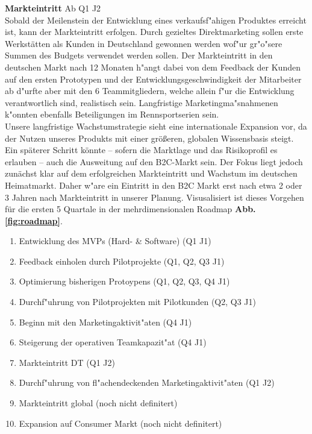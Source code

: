 \textbf{Markteintritt} Ab Q1 J2 \\
Sobald der Meilenstein der Entwicklung eines verkaufsf"ahigen Produktes erreicht ist, kann der Markteintritt erfolgen. Durch gezieltes Direktmarketing sollen erste Werkst\"atten als Kunden in Deutschland gewonnen werden wof"ur gr"o"sere Summen des Budgets verwendet werden sollen. Der Markteintritt in den deutschen Markt nach 12 Monaten h"angt dabei von dem Feedback der Kunden auf den ersten Prototypen und der Entwicklungsgeschwindigkeit der Mitarbeiter ab d"urfte aber mit den 6 Teammitgliedern, welche allein f"ur die Entwicklung verantwortlich sind, realistisch sein. Langfristige Marketingma"snahmenen k"onnten ebenfalls Beteiligungen im Rennsportserien sein. \\

Unsere langfristige Wachstumstrategie sieht eine internationale Expansion vor, da der Nutzen unseres Produkts mit einer größeren, globalen Wissensbasis steigt. Ein späterer Schritt könnte – sofern die Marktlage und das Risikoprofil es erlauben – auch die Ausweitung auf den \ac{B2C}-Markt sein. Der Fokus liegt jedoch zunächst klar auf dem erfolgreichen Markteintritt und Wachstum im deutschen Heimatmarkt. Daher w"are ein Eintritt in den \ac{B2C} Markt erst nach etwa 2 oder 3 Jahren nach Markteintritt in unserer Planung. Visusalisiert ist dieses Vorgehen für die ersten 5 Quartale in der mehrdimensionalen Roadmap \textbf{Abb. \ref{fig:roadmap}}.



\begin{enumerate}
    \item Entwicklung des \ac{MVP}s (Hard- \& Software) (Q1 J1)
    \item Feedback einholen durch Pilotprojekte (Q1, Q2, Q3 J1)
    \item Optimierung bisherigen Protoypens (Q1, Q2, Q3, Q4 J1)
    \item Durchf"uhrung von Pilotprojekten mit Pilotkunden (Q2, Q3 J1)
    \item Beginn mit den Marketingaktivit"aten (Q4 J1)
    \item Steigerung der operativen Teamkapazit"at (Q4 J1)
    \item Markteintritt DT (Q1 J2)
    \item Durchf"uhrung von fl"achendeckenden Marketingaktivit"aten (Q1 J2)
    \item Markteintritt global (noch nicht definitert)
    \item Expansion auf Consumer Markt (noch nicht definitert)
\end{enumerate}


